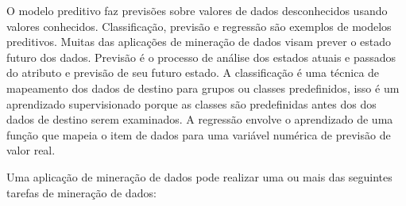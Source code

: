 O modelo preditivo faz previsões sobre valores de dados desconhecidos usando valores conhecidos. Classificação, previsão e regressão são exemplos de modelos preditivos. Muitas das aplicações de mineração de dados visam prever o estado futuro dos dados. Previsão é o processo de análise dos estados atuais e passados do atributo e previsão de seu futuro estado. A classificação é uma técnica de mapeamento dos dados de destino para grupos ou classes predefinidos, isso é um aprendizado supervisionado porque as classes são predefinidas antes dos dos dados de destino serem examinados. A regressão envolve o aprendizado de uma função que mapeia o item de dados para uma variável numérica de previsão de valor real.

Uma aplicação de mineração de dados pode realizar uma ou mais das seguintes tarefas de mineração de dados:

